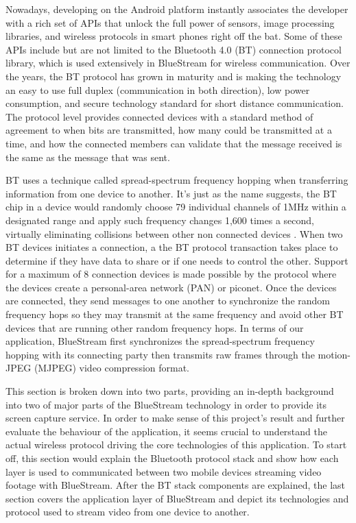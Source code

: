 \documentclass[a4paper,12pt]{article}
\begin{document}
Nowadays, developing on the Android platform instantly associates the developer with a rich set of APIs that unlock the full power of sensors, image processing libraries, and wireless protocols in smart phones right off the bat. Some of these APIs include but are not limited to the Bluetooth 4.0 (BT) connection protocol library, which is used extensively in BlueStream for wireless communication. Over the years, the BT protocol has grown in maturity and is making the technology an easy to use full duplex (communication in both direction), low power consumption, and secure technology standard for short distance communication. The protocol level provides connected devices with a standard method of agreement to when bits are transmitted, how many could be transmitted at a time, and how the connected members can validate that the message received is the same as the message that was sent.

BT uses a technique called spread-spectrum frequency hopping when transferring information from one device to another. It’s just as the name suggests, the BT chip in a device would randomly choose 79 individual channels of 1MHz within a designated range and apply such frequency changes 1,600 times a second, virtually eliminating collisions between other non connected devices \cite{InsideBlueTooth}. When two BT devices initiates a connection, a the BT protocol transaction takes place to determine if they have data to share or if one needs to control the other. Support for a maximum of 8 connection devices is made possible by the protocol where the devices create a personal-area network (PAN) or piconet. Once the devices are connected, they send messages to one another to synchronize the random frequency hops so they may transmit at the same frequency and avoid other BT devices that are running other random frequency hops. In terms of our application, BlueStream first synchronizes the spread-spectrum frequency hopping with its connecting party then transmits raw frames through the motion-JPEG (MJPEG) video compression format. 

This section is broken down into two parts, providing an in-depth background into two of major parts of the BlueStream technology in order to provide its screen capture service. In order to make sense of this project’s result and further evaluate the behaviour of the application, it seems crucial to understand the actual wireless protocol driving the core technologies of this application. To start off, this section would explain the Bluetooth protocol stack and show how each layer is used to communicated between two mobile devices streaming video footage with BlueStream. After the BT stack components are explained, the last section covers the application layer of BlueStream and depict its technologies and protocol used to stream video from one device to another.
\end{document}
